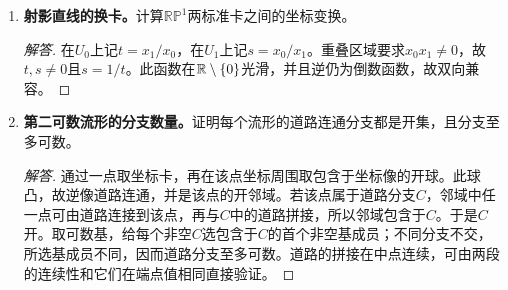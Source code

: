 \begin{enumerate}[label=\textbf{3.\arabic*.},ref=3.\arabic*,leftmargin=*]
\begin{proof}[解答]
\end{proof}
\item \textbf{射影直线的换卡。}计算$\mathbb{RP}^1$两标准卡之间的坐标变换。
\begin{proof}[解答]
在$U_0$上记$t=x_1/x_0$，在$U_1$上记$s=x_0/x_1$。重叠区域要求$x_0x_1\ne0$，故$t,s\ne0$且$s=1/t$。此函数在$\mathbb{R}\setminus\{0\}$光滑，并且逆仍为倒数函数，故双向兼容。
\end{proof}
\item \textbf{第二可数流形的分支数量。}证明每个流形的道路连通分支都是开集，且分支至多可数。
\begin{proof}[解答]
通过一点取坐标卡，再在该点坐标周围取包含于坐标像的开球。此球凸，故逆像道路连通，并是该点的开邻域。若该点属于道路分支$C$，邻域中任一点可由道路连接到该点，再与$C$中的道路拼接，所以邻域包含于$C$。于是$C$开。取可数基，给每个非空$C$选包含于$C$的首个非空基成员；不同分支不交，所选基成员不同，因而道路分支至多可数。道路的拼接在中点连续，可由两段的连续性和它们在端点值相同直接验证。
\end{proof}
\end{enumerate}
